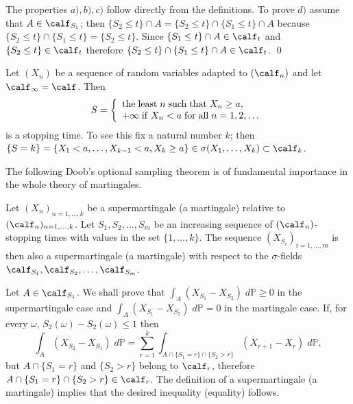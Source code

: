 \documentclass[preprint]{imsart}
\def\P{\mathbb P}
\begin{document}
{  The properties $a), b), c)$ follow
directly from the definitions. To prove $d)$ assume that
$A\in \calf_{S_1}$; then $\{S_2\le t\}\cap A=
\{S_2\le t\}\cap \{S_1\le t\}\cap A$ because
$\{S_2\le t\}\cap \{S_1\le t\}= \{S_2\le t\}$.
Since $ \{S_1\le t\}\cap A\in \calf_{t}$ and
$\{S_2\le t\}\in \calf_t$ therefore
$\{S_2\le t\}\cap \{S_1\le t\}\cap A\in \calf_t$.
\qed


\begin{Example}\label{esstopping}\begin{em}
  Let $(X_n)$ be a sequence of random variables adapted to
  $(\calf_n)$
  and let $\calf_\infty=\calf$. Then
  $$
  S=\left\{\begin{array}{l}
  {\rm the \; least\;} n{\rm \; such\; that\;} X_n\ge a,
  \\
  +\infty {\rm \; if \; } X_n<a {\rm \; for\; all\;} n=1,2,\ldots
  \end{array}
  \right.
  $$
  is a stopping time. To see this fix a natural number $k$; then
  $\{S=k\}= \{X_1<a,\ldots ,X_{k-1}<a,X_k\ge a\}\in
  \sigma (X_1,\ldots ,X_k)\subset \calf_k$.
\end{em}
\end{Example}


The following Doob's optional sampling theorem is of fundamental
importance in the whole theory of martingales.

\begin{Theorem}\label{doobsampling}
  Let $(X_n)_{n=1,\ldots ,k}$ be a supermartingale (a martingale)
  relative to
  \\
  $(\calf_n)_{n=1,\ldots ,k}$. Let $S_1,S_2,\ldots
  ,S_m$ be an increasing sequence of $(\calf_n)$-stopping times with values in the set $\{1,\ldots ,k\}$.
  The sequence $(X_{S_i})_{i=1,\ldots ,m}$ is then also a
  supermartingale (a martingale) with respect to the
  $\sigma$-fields $\calf_{S_1},\calf_{S_2},\ldots,\calf_{S_m}$.
\end{Theorem}

 Let $A\in\calf_{S_1}$. We shall prove that
$\int_A(X_{S_1}-X_{S_2})\; d\P\ge 0$ in the supermartingale case
and
$\int_A(X_{S_1}-X_{S_2})\; d\P= 0$ in the martingale case. If, for
every $\omega$, ${S_2}(\omega)-{S_2}(\omega)\le 1$
then
$$
\int_A(X_{S_2}-X_{S_1})\; d\P=
\sum_{r=1}^k \int_{A\cap \{S_1=r\}\cap \{S_2>r\}}
(X_{r+1}-X_{r})\; d\P,
$$
but $A\cap \{S_1=r\}$ and $ \{S_2>r\}$ belong to $\calf_r$,
therefore $A\cap \{S_1=r\}\cap \{S_2>r\}\in\calf_r$. The
definition of a supermartingale (a martingale) implies that the
desired inequality (equality) follows.

}
\end{document}

